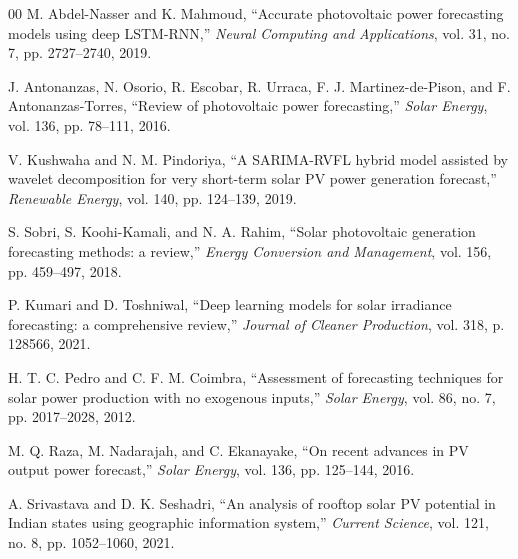 \documentclass[conference]{IEEEtran}
\begin{document}
\begin{thebibliography}{00}
 M. Abdel-Nasser and K. Mahmoud, ``Accurate photovoltaic power forecasting models using deep LSTM-RNN,'' \textit{Neural Computing and Applications}, vol. 31, no. 7, pp. 2727--2740, 2019.

 J. Antonanzas, N. Osorio, R. Escobar, R. Urraca, F. J. Martinez-de-Pison, and F. Antonanzas-Torres, ``Review of photovoltaic power forecasting,'' \textit{Solar Energy}, vol. 136, pp. 78--111, 2016.

 V. Kushwaha and N. M. Pindoriya, ``A SARIMA-RVFL hybrid model assisted by wavelet decomposition for very short-term solar PV power generation forecast,'' \textit{Renewable Energy}, vol. 140, pp. 124--139, 2019.

 S. Sobri, S. Koohi-Kamali, and N. A. Rahim, ``Solar photovoltaic generation forecasting methods: a review,'' \textit{Energy Conversion and Management}, vol. 156, pp. 459--497, 2018.

 P. Kumari and D. Toshniwal, ``Deep learning models for solar irradiance forecasting: a comprehensive review,'' \textit{Journal of Cleaner Production}, vol. 318, p. 128566, 2021.

 H. T. C. Pedro and C. F. M. Coimbra, ``Assessment of forecasting techniques for solar power production with no exogenous inputs,'' \textit{Solar Energy}, vol. 86, no. 7, pp. 2017--2028, 2012.

 M. Q. Raza, M. Nadarajah, and C. Ekanayake, ``On recent advances in PV output power forecast,'' \textit{Solar Energy}, vol. 136, pp. 125--144, 2016.

 A. Srivastava and D. K. Seshadri, ``An analysis of rooftop solar PV potential in Indian states using geographic information system,'' \textit{Current Science}, vol. 121, no. 8, pp. 1052--1060, 2021.
\end{thebibliography}
\end{document}
